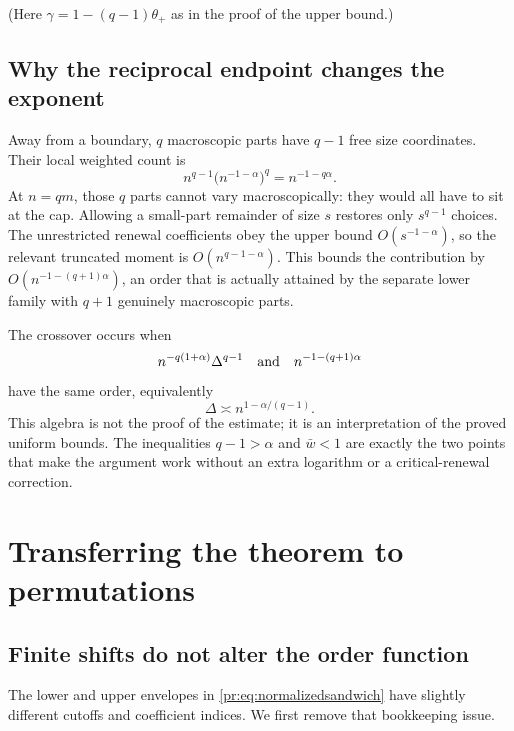 \documentclass[11pt,a4paper]{article}
\theoremstyle{definition}\newaliascnt{definition}{theorem}
\theoremstyle{remark}\newaliascnt{remark}{theorem}
\begin{document}
(Here $\gamma=1-(q-1)\theta_+$ as in the proof of the upper bound.)

\subsection{Why the reciprocal endpoint changes the exponent}
Away from a boundary, $q$ macroscopic parts have $q-1$ free size
coordinates. Their local weighted count is
\[
 n^{q-1}\bigl(n^{-1-\alpha}\bigr)^q=n^{-1-q\alpha}.
\]
At $n=qm$, those $q$ parts cannot vary macroscopically: they would all have
to sit at the cap. Allowing a small-part remainder of size $s$ restores only
$s^{q-1}$ choices. The unrestricted renewal coefficients obey the upper
bound $O(s^{-1-\alpha})$, so the relevant truncated moment is
$O(n^{q-1-\alpha})$. This bounds the contribution by
$O(n^{-1-(q+1)\alpha})$, an order that is actually attained by the separate
lower family with $q+1$ genuinely macroscopic parts.

The crossover occurs when
\[
 n^{-q(1+\alpha)}\Delta^{q-1}
 \quad\hbox{and}\quad n^{-1-(q+1)\alpha}
\]
have the same order, equivalently
\begin{equation}
 \Delta\asymp n^{1-\alpha/(q-1)}.
 \label{pr:eq:generalwindow}
\end{equation}
This algebra is not the proof of the estimate; it is an interpretation of the
proved uniform bounds. The inequalities $q-1>\alpha$ and $\bar w<1$ are
exactly the two points that make the argument work without an extra
logarithm or a critical-renewal correction.

\section{Transferring the theorem to permutations}
\label{pr:sec:application}

\subsection{Finite shifts do not alter the order function}
The lower and upper envelopes in \eqref{pr:eq:normalizedsandwich} have
slightly different cutoffs and coefficient indices. We first remove that
bookkeeping issue.
\end{document}
